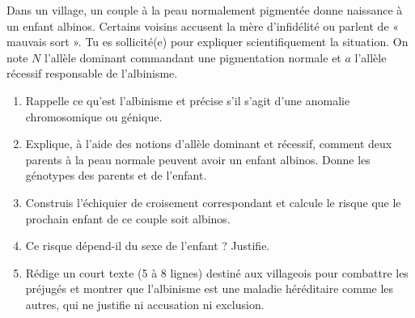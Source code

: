 \documentclass[11pt]{article}
\begin{document}
\begin{exercice}
Dans un village, un couple à la peau normalement pigmentée donne naissance à un enfant albinos. Certains voisins accusent la mère d'infidélité ou parlent de « mauvais sort ». Tu es sollicité(e) pour expliquer scientifiquement la situation. On note $N$ l'allèle dominant commandant une pigmentation normale et $a$ l'allèle récessif responsable de l'albinisme.
\begin{enumerate}
\item Rappelle ce qu'est l'albinisme et précise s'il s'agit d'une anomalie chromosomique ou génique.
\item Explique, à l'aide des notions d'allèle dominant et récessif, comment deux parents à la peau normale peuvent avoir un enfant albinos. Donne les génotypes des parents et de l'enfant.
\item Construis l'échiquier de croisement correspondant et calcule le risque que le prochain enfant de ce couple soit albinos.
\item Ce risque dépend-il du sexe de l'enfant ? Justifie.
\item Rédige un court texte (5 à 8 lignes) destiné aux villageois pour combattre les préjugés et montrer que l'albinisme est une maladie héréditaire comme les autres, qui ne justifie ni accusation ni exclusion.
\end{enumerate}
\end{exercice}
\end{document}

